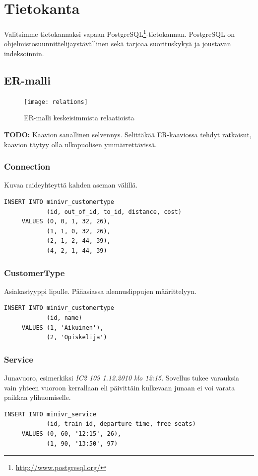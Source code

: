 \documentclass[a4paper,twoside,titlepage,12pt]{article}
\begin{document}
\lstset{language=SQL}

\section{Tietokanta}

Valitsimme tietokannaksi vapaan PostgreSQL\footnote{\url{http://www.postgresql.org/}}-tietokannan. PostgreSQL on ohjelmistosuunnittelijaystävällinen sekä tarjoaa suorituskykyä ja joustavan indeksoinnin.

\subsection{ER-malli}

\begin{figure}
  \texttt{[image: relations]}
  \caption{ER-malli keskeisimmista relaatioista}
\end{figure}

\textbf{TODO:} Kaavion sanallinen selvennys. Selittäkää ER-kaaviossa tehdyt ratkaisut, kaavion täytyy olla ulkopuolisen ymmärrettävissä.

\subsubsection{Connection}

Kuvaa raideyhteyttä kahden aseman välillä.
\begin{lstlisting}
INSERT INTO minivr_customertype
            (id, out_of_id, to_id, distance, cost)
     VALUES (0, 0, 1, 32, 26),
            (1, 1, 0, 32, 26),
            (2, 1, 2, 44, 39),
            (4, 2, 1, 44, 39)
\end{lstlisting}

\subsubsection{CustomerType}

Asiakastyyppi lipulle. Pääasiassa alennuslippujen määrittelyyn.
\begin{lstlisting}
INSERT INTO minivr_customertype
            (id, name)
     VALUES (1, 'Aikuinen'),
            (2, 'Opiskelija')
\end{lstlisting}

\subsubsection{Service}

Junavuoro, esimerkiksi \emph{IC2 109 1.12.2010 klo 12:15}. Sovellus tukee varauksia vain yhteen vuoroon kerrallaan eli päivittäin kulkevaan junaan ei voi varata paikkaa ylihuomiselle.
\begin{lstlisting}
INSERT INTO minivr_service
            (id, train_id, departure_time, free_seats)
     VALUES (0, 60, '12:15', 26),
            (1, 90, '13:50', 97)
\end{lstlisting}
\end{document}
